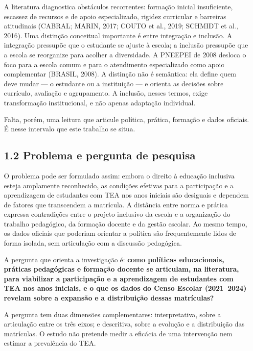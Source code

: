 A literatura diagnostica obstáculos recorrentes: formação inicial
insuficiente, escassez de recursos e de apoio especializado, rigidez
curricular e barreiras atitudinais (CABRAL; MARIN, 2017; COUTO et al.,
2019; SCHMIDT et al., 2016). Uma distinção conceitual importante é entre
integração e inclusão. A integração pressupõe que o estudante se ajuste
à escola; a inclusão pressupõe que a escola se reorganize para acolher a
diversidade. A PNEEPEI de 2008 desloca o foco para a escola comum e para
o atendimento especializado como apoio complementar (BRASIL, 2008). A
distinção não é semântica: ela define quem deve mudar --- o estudante ou
a instituição --- e orienta as decisões sobre currículo, avaliação e
agrupamento. A inclusão, nesses termos, exige transformação
institucional, e não apenas adaptação individual.

Falta, porém, uma leitura que articule política, prática, formação e
dados oficiais. É nesse intervalo que este trabalho se situa.

\subsection{1.2 Problema e pergunta de
pesquisa}\label{problema-e-pergunta-de-pesquisa}

O problema pode ser formulado assim: embora o direito à educação
inclusiva esteja amplamente reconhecido, as condições efetivas para a
participação e a aprendizagem de estudantes com TEA nos anos iniciais
são desiguais e dependem de fatores que transcendem a matrícula. A
distância entre norma e prática expressa contradições entre o projeto
inclusivo da escola e a organização do trabalho pedagógico, da formação
docente e da gestão escolar. Ao mesmo tempo, os dados oficiais que
poderiam orientar a política são frequentemente lidos de forma isolada,
sem articulação com a discussão pedagógica.

A pergunta que orienta a investigação é: \textbf{como políticas
educacionais, práticas pedagógicas e formação docente se articulam, na
literatura, para viabilizar a participação e a aprendizagem de
estudantes com TEA nos anos iniciais, e o que os dados do Censo Escolar
(2021--2024) revelam sobre a expansão e a distribuição dessas
matrículas?}

A pergunta tem duas dimensões complementares: interpretativa, sobre a
articulação entre os três eixos; e descritiva, sobre a evolução e a
distribuição das matrículas. O estudo não pretende medir a eficácia de
uma intervenção nem estimar a prevalência do TEA.

